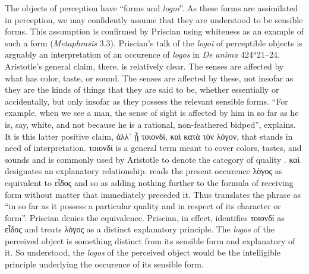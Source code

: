 \documentclass[12pt]{article}
\begin{document}
The objects of perception have ``forms and \emph{logoi}''. As these forms are assimilated in perception, we may confidently assume that they are understood to be sensible forms. This assumption is confirmed by Priscian using whiteness as an example of such a form (\emph{Metaphrasis} 3.3). Priscian's talk of the \emph{logoi} of perceptible objects is arguably an interpretation of an occurence of \emph{logos} in \emph{De anima} 424\( ^{a} \)21--24. Aristotle's general claim, there, is relatively clear. The senses are affected by what has color, taste, or sound. The senses are affected by these, not insofar as they are the kinds of things that they are said to be, whether essentially or accidentally, but only insofar as they possess the relevant sensible forms. ``For example, when we see a man, the sense of sight is affected by him in so far as he is, say, white, and not because he is a rational, non-feathered bidped'', \citet[113]{Hamlyn:2002ys} explains. It is this latter positive claim, {\sbl ἀλλ᾽ ᾗ τοιονδί, καὶ κατὰ τὸν λόγον}, that stands in need of interpretation. {\sbl τοιονδί} is a general term meant to cover colors, tastes, and sounds and is commonly used by Aristotle to denote the category of quality \citep[416]{Hicks:1907uq}. {\sbl καὶ} designates an explanatory relationship. \citet[417]{Hicks:1907uq} reads the present occurence {\sbl λὸγος} as equivalent to {\sbl εἶδος} and so as adding nothing further to the formula of receiving form without matter that immediately preceded it. Thus \citet[105]{Hicks:1907uq} translates the phrase as ``in so far as it possess a particular quality and in respect of its character or form''. Priscian denies the equivalence. Priscian, in effect, identifies {\sbl τοιονδί} as {\sbl εἶδος} and treats {\sbl λὸγος} as a distinct explanatory principle. The \emph{logos} of the perceived object is something distinct from its sensible form and explanatory of it. So understood, the \emph{logos} of the perceived object would be the intelligible principle underlying the occurence of its sensible form.

\end{document}
